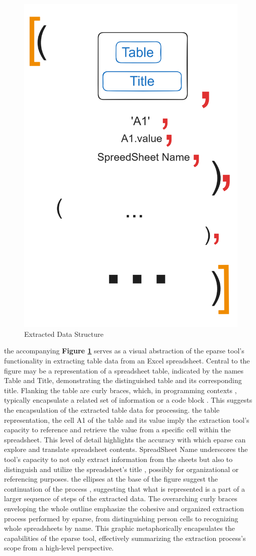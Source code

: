 \begin{figure}[H]
    \centering
    \includegraphics[width=0.4 \linewidth]{assets/eparse_output1.png}
    \caption{Extracted Data Structure}
    \label{fig:extstruct}
\end{figure}

the accompanying \textbf{Figure \ref{fig:extstruct}} serves as a visual abstraction of the eparse tool's functionality in extracting table data from an Excel spreadsheet. Central to the figure may be a representation of a spreadsheet table, indicated by the names Table and Title, demonstrating the distinguished table and its corresponding title. Flanking the table are curly braces, which, in programming contexts , typically encapsulate a related set of information or a code block . This suggests the encapsulation of the extracted table data for processing. the table representation, the cell A1 of the table and its value imply the extraction tool's capacity to reference and retrieve the value from a specific cell within the spreadsheet. This level of detail highlights the accuracy with which eparse can explore and translate spreadsheet contents. SpreadSheet Name underscores the tool's capacity to not only extract information from the sheets but also to distinguish and utilize the spreadsheet's title , possibly for organizational or referencing purposes.
\vskip 0.5cm
the ellipses at the base of the figure suggest the continuation of the process , suggesting that what is represented is a part of a larger sequence of steps of the extracted data. The overarching curly braces enveloping the whole outline emphasize the cohesive and organized extraction process performed by eparse, from distinguishing person cells to recognizing whole spreadsheets by name.
\vskip 0.5cm
This graphic metaphorically encapsulates the capabilities of the eparse tool, effectively summarizing the extraction process's scope from a high-level perspective.


